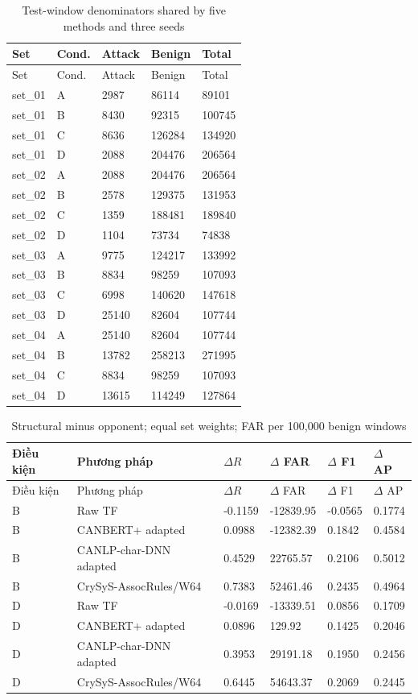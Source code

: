 \documentclass[12pt,a4paper,oneside,openany]{extbook}
\begin{document}
\begin{longtable}{P{2.0cm}P{1.2cm}P{2.7cm}P{2.7cm}P{2.7cm}}
\caption{Test-window denominators shared by five methods and three seeds}\label{tab:comparison-counts}\\\toprule
Set & Cond. & Attack & Benign & Total\\\midrule\endfirsthead
\toprule
Set & Cond. & Attack & Benign & Total\\\midrule\endhead
set\_01 & A & 2987 & 86114 & 89101\\
set\_01 & B & 8430 & 92315 & 100745\\
set\_01 & C & 8636 & 126284 & 134920\\
set\_01 & D & 2088 & 204476 & 206564\\
set\_02 & A & 2088 & 204476 & 206564\\
set\_02 & B & 2578 & 129375 & 131953\\
set\_02 & C & 1359 & 188481 & 189840\\
set\_02 & D & 1104 & 73734 & 74838\\
set\_03 & A & 9775 & 124217 & 133992\\
set\_03 & B & 8834 & 98259 & 107093\\
set\_03 & C & 6998 & 140620 & 147618\\
set\_03 & D & 25140 & 82604 & 107744\\
set\_04 & A & 25140 & 82604 & 107744\\
set\_04 & B & 13782 & 258213 & 271995\\
set\_04 & C & 8834 & 98259 & 107093\\
set\_04 & D & 13615 & 114249 & 127864\\
\bottomrule\end{longtable}
\begin{longtable}{P{1.2cm}P{4.0cm}P{1.7cm}P{2.2cm}P{1.7cm}P{1.7cm}}
\caption{Structural minus opponent; equal set weights; FAR per 100,000 benign windows}\label{tab:comparison-paired}\\\toprule
Điều kiện & Phương pháp & $\Delta R$ & $\Delta$ FAR & $\Delta$ F1 & $\Delta$ AP\\\midrule\endfirsthead
\toprule
Điều kiện & Phương pháp & $\Delta R$ & $\Delta$ FAR & $\Delta$ F1 & $\Delta$ AP\\\midrule\endhead
B & Raw TF & -0.1159 & -12839.95 & -0.0565 & 0.1774\\
B & CANBERT+ adapted & 0.0988 & -12382.39 & 0.1842 & 0.4584\\
B & CANLP-char-DNN adapted & 0.4529 & 22765.57 & 0.2106 & 0.5012\\
B & CrySyS-AssocRules/W64 & 0.7383 & 52461.46 & 0.2435 & 0.4964\\
D & Raw TF & -0.0169 & -13339.51 & 0.0856 & 0.1709\\
D & CANBERT+ adapted & 0.0896 & 129.92 & 0.1425 & 0.2046\\
D & CANLP-char-DNN adapted & 0.3953 & 29191.18 & 0.1950 & 0.2456\\
D & CrySyS-AssocRules/W64 & 0.6445 & 54643.37 & 0.2069 & 0.2445\\
\bottomrule\end{longtable}
\end{document}
